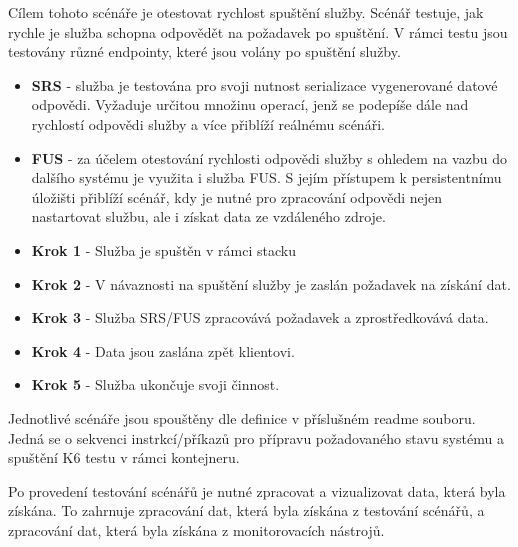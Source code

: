 
Cílem tohoto scénáře je otestovat rychlost spuštění služby. Scénář testuje, jak rychle je služba schopna odpovědět na požadavek po spuštění. V rámci testu jsou testovány různé endpointy, které jsou volány po spuštění služby.


\begin{itemize}
    \item \textbf{SRS} - služba je testována pro svoji nutnost serializace vygenerované datové odpovědi. Vyžaduje určitou množinu operací, jenž se podepíše dále nad rychlostí odpovědi služby a více přiblíží reálnému scénáři.
    \item \textbf{FUS} - za účelem otestování rychlosti odpovědi služby s ohledem na vazbu do dalšího systému je využita i služba FUS. S jejím přístupem k persistentnímu úložišti přiblíží scénář, kdy je nutné pro zpracování odpovědi nejen nastartovat službu, ale i získat data ze vzdáleného zdroje.
\end{itemize}


\begin{itemize}
    \item \textbf{Krok 1} - Služba je spuštěn v rámci stacku
    \item \textbf{Krok 2} - V návaznosti na spuštění služby je zaslán požadavek na získání dat.
    \item \textbf{Krok 3} - Služba SRS/FUS zpracovává požadavek a zprostředkovává data.
    \item \textbf{Krok 4} - Data jsou zaslána zpět klientovi.
    \item \textbf{Krok 5} - Služba ukončuje svoji činnost.
\end{itemize}


Jednotlivé scénáře jsou spouštěny dle definice v příslušném readme souboru. Jedná se o sekvenci instrkcí/příkazů pro přípravu požadovaného stavu systému a spuštění K6 testu v rámci kontejneru.


Po provedení testování scénářů je nutné zpracovat a vizualizovat data, která byla získána. To zahrnuje zpracování dat, která byla získána z testování scénářů, a zpracování dat, která byla získána z monitorovacích nástrojů.


